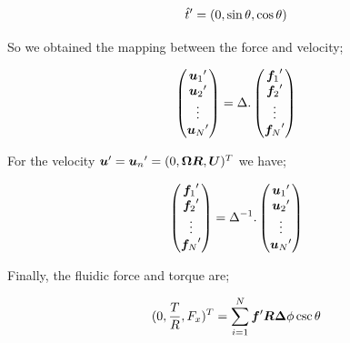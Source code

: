 \documentclass[12pt,a4paper,titlepage]{report}
\begin{document}
\begin{equation}
{\hat{t}}\rq{}= (0, \sin \theta, \cos \theta)
\label{invariant}
\end{equation}






So we obtained the mapping between the force and velocity;



\begin{equation}
\begin{pmatrix}
  {\bm{u}_1}\rq{}  \\
  {\bm{u}_2}\rq{} \\
  \vdots  \\
   {\bm{u}_N}\rq{} 
 \end{pmatrix} = \Delta . \begin{pmatrix}
  {\bm{f}_1}\rq{}  \\
  {\bm{f}_2}\rq{} \\
  \vdots  \\
   {\bm{f}_N}\rq{} 
 \end{pmatrix}
\label{mapping}
\end{equation}


For the velocity $\bm{u}\rq{} = {\bm{u}_n}\rq{} = (0, \bm{\Omega} \bm{R}, \bm{U})^T$ we have;



\begin{equation}
\begin{pmatrix}
  {\bm{f}_1}\rq{}  \\
  {\bm{f}_2}\rq{} \\
  \vdots  \\
   {\bm{f}_N}\rq{} 
 \end{pmatrix} = {\Delta}^{-1}. \begin{pmatrix}
  {\bm{u}_1}\rq{}  \\
  {\bm{u}_2}\rq{} \\
  \vdots  \\
   {\bm{u}_N}\rq{} 
 \end{pmatrix}
\label{mappingInverse}
\end{equation}


Finally, the fluidic force and torque are;



\begin{equation}
 (0, \frac{T}{R}, F_x)^T = \sum_{i=1}^{N} \bm{f}\rq{} \bm{R} \bm{\Delta}\phi \csc \theta
\label{torqForce}
\end{equation}
\end{document}

